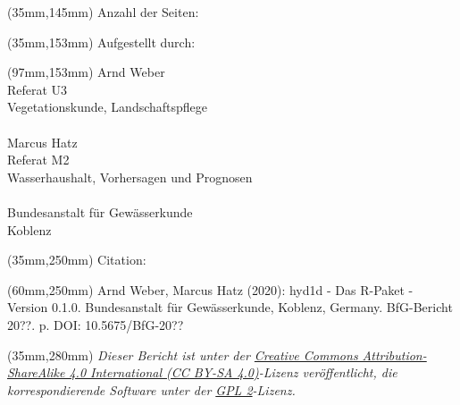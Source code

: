 \begin{titlepage}
    \begin{textblock*}{150mm}(35mm,145mm)
    \fontsize{15}{17}\selectfont\noindent
    Anzahl der Seiten: \pageref{LastPage}
    \end{textblock*}

    \begin{textblock*}{150mm}(35mm,153mm)
    \fontsize{15}{17}\selectfont\noindent
    Aufgestellt durch:
    \end{textblock*}

    \begin{textblock*}{85mm}(97mm,153mm)
    \fontsize{15}{17}\selectfont\noindent
    Arnd Weber \\
    Referat U3 \\
    Vegetationskunde, Landschaftspflege \\
    \\
    Marcus Hatz \\
    Referat M2 \\
    Wasserhaushalt, Vorhersagen und Prognosen \\
    \\
    Bundesanstalt für Gewässerkunde \\
    Koblenz \\
    \end{textblock*}

    \begin{textblock*}{150mm}(35mm,250mm)
    \fontsize{10}{12}\selectfont\noindent
    Citation:
    \end{textblock*}

    \begin{textblock*}{120mm}(60mm,250mm)
    \fontsize{10}{12}\selectfont\noindent
    Arnd Weber, Marcus Hatz (2020): hyd1d - Das R-Paket - Version 0.1.0. Bundesanstalt für Gewässerkunde, Koblenz, Germany. BfG-Bericht 20??. \pageref*{LastPage} p. DOI: 10.5675/BfG-20??
    \end{textblock*}

    \begin{textblock*}{190mm}(35mm,280mm)
    \fontsize{8}{9}\selectfont\noindent
    \textit{Dieser Bericht ist unter der \href{https://creativecommons.org/licenses/by-sa/4.0/}{Creative Commons Attribution-ShareAlike 4.0 International (CC BY-SA 4.0)}-Lizenz veröffentlicht, die \\ korrespondierende Software unter der \href{https://www.gnu.org/licenses/gpl-2.0}{GPL 2}-Lizenz.}
    \end{textblock*}
    ~
\end{titlepage}

\newpage


